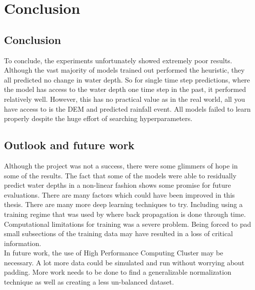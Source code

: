 
\chapter{Conclusion} %
\label{Chapter6} %

\section{Conclusion}
To conclude, the experiments unfortunately showed extremely poor results. Although the vast majority of models trained out performed the heuristic, they all predicted no change in water depth. So for single time step predictions, where the model has access to the water depth one time step in the past, it performed relatively well. However, this has no practical value as in the real world, all you have access to is the DEM and predicted rainfall event. All models failed to learn properly despite the huge effort of searching hyperparameters.

\section{Outlook and future work}
Although the project was not a success, there were some glimmers of hope in some of the results. The fact that some of the models were able to residually predict water depths in a non-linear fashion shows some promise for future evaluations. There are many factors which could have been improved in this thesis. There are many more deep learning techniques to try. Including using a training regime that was used  by \citeauthor{growing_nca} where back propagation is done through time. Computational limitations for training was a severe problem. Being forced  to pad small subsections of the training data may have resulted in a loss of critical information. \\

In future work, the use of High Performance Computing Cluster may be necessary. A lot more data could be simulated and run without worrying about padding. More work needs to be done to find a generalizable normalization technique as well as creating a less un-balanced dataset. 
 